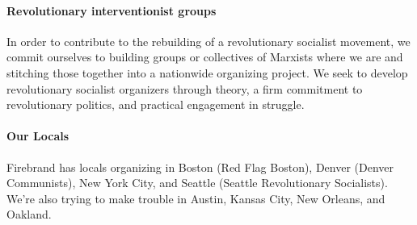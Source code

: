 \paragraph{Revolutionary interventionist groups}

In order to contribute to the rebuilding of a revolutionary socialist movement, we commit ourselves to building groups or collectives of Marxists where we are and stitching those together into a nationwide organizing project. We seek to develop revolutionary socialist organizers through theory, a firm commitment to revolutionary politics, and practical engagement in struggle.

\paragraph{Our Locals}

Firebrand has locals organizing in Boston (Red Flag Boston), Denver (Denver Communists), New York City, and Seattle (Seattle Revolutionary Socialists). We're also trying to make trouble in Austin, Kansas City, New Orleans, and Oakland.
